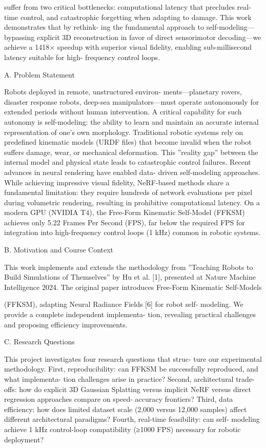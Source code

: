 \documentclass[10pt,twocolumn,letterpaper]{article}
\begin{document}
suffer from two critical bottlenecks: computational latency that precludes real-time control, and catastrophic forgetting when adapting to damage. This work demonstrates that by rethink- ing the fundamental approach to self-modeling—bypassing explicit 3D reconstruction in favor of direct sensorimotor decoding—we achieve a 1418× speedup with superior visual fidelity, enabling sub-millisecond latency suitable for high- frequency control loops.

A. Problem Statement

Robots deployed in remote, unstructured environ- ments—planetary rovers, disaster response robots, deep-sea manipulators—must operate autonomously for extended periods without human intervention. A critical capability for such autonomy is self-modeling: the ability to learn and maintain an accurate internal representation of one’s own morphology. Traditional robotic systems rely on predefined kinematic models (URDF files) that become invalid when the robot suffers damage, wear, or mechanical deformation. This ”reality gap” between the internal model and physical state leads to catastrophic control failures. Recent advances in neural rendering have enabled data- driven self-modeling approaches. While achieving impressive visual fidelity, NeRF-based methods share a fundamental limitation: they require hundreds of network evaluations per pixel during volumetric rendering, resulting in prohibitive computational latency. On a modern GPU (NVIDIA T4), the Free-Form Kinematic Self-Model (FFKSM) achieves only 5.22 Frames Per Second (FPS), far below the required FPS for integration into high-frequency control loops (1 kHz) common in robotic systems.

B. Motivation and Course Context

This work implements and extends the methodology from ”Teaching Robots to Build Simulations of Themselves” by Hu et al. [1], presented at Nature Machine Intelligence 2024. The original paper introduces Free-Form Kinematic Self-Models

(FFKSM), adapting Neural Radiance Fields [6] for robot self- modeling. We provide a complete independent implementa- tion, revealing practical challenges and proposing efficiency improvements.

C. Research Questions

This project investigates four research questions that struc- ture our experimental methodology. First, reproducibility: can FFKSM be successfully reproduced, and what implementa- tion challenges arise in practice? Second, architectural trade- offs: how do explicit 3D Gaussian Splatting versus implicit NeRF versus direct regression approaches compare on speed- accuracy frontiers? Third, data efficiency: how does limited dataset scale (2,000 versus 12,000 samples) affect different architectural paradigms? Fourth, real-time feasibility: can self- modeling achieve 1 kHz control-loop compatibility (≥1000 FPS) necessary for robotic deployment?
\end{document}
